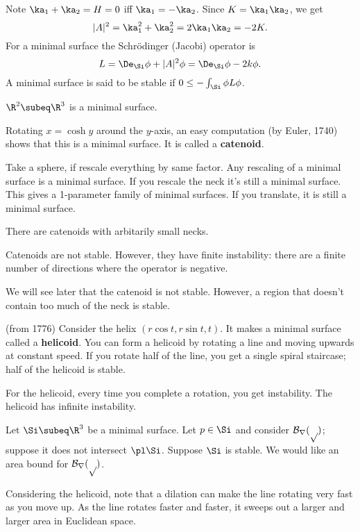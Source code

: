 Note $\ka_1+\ka_2=H=0$ iff $\ka_1=-\ka_2$. Since $K=\ka_1\ka_2$, we get
\[
|A|^2=\ka_1^2+\ka_2^2 =2\ka_1\ka_2=-2K.
\]
For a minimal surface the Schr\"odinger (Jacobi) operator is
\[
L=\De_{\Si} \phi+|A|^2\phi = \De_{\Si}\phi -2k\phi.
\]
A minimal surface is said to be stable if $0\le -\int_{\Si}\phi L\phi$.
\begin{ex}
$\R^2\subeq \R^3$ is a minimal surface.
\end{ex}
\begin{ex}
Rotating $x=\cosh y$ around the $y$-axis, an easy computation (by Euler, 1740) shows that this is a minimal surface. It is called a \textbf{catenoid}. 


Take a sphere, if rescale everything by same factor. Any rescaling of a minimal surface is a minimal surface. 
If you rescale the neck it's still a minimal surface. This gives a 1-parameter family of minimal surfaces. If you translate, it is still a minimal surface.

There are catenoids with arbitarily small necks.

Catenoids are not stable. However, they have finite instability: there are a finite number of directions where the operator is negative.
\end{ex}
We will see later that the catenoid is not stable. However, a region that doesn't contain too much of the neck is stable.
\begin{ex}(from 1776) 
Consider the helix $(r\cos t,r\sin t,t)$. It makes a minimal surface called a \textbf{helicoid}. You can form a helicoid by rotating a line and moving upwards at constant speed. If you rotate half of the line, you get a single spiral staircase; half of the helicoid is stable. 


For the helicoid, every time you complete a rotation, you get instability. %
The helicoid has infinite instability.
\end{ex}

Let $\Si\subeq \R^3$ be a minimal surface. Let $p\in \Si$ and consider $\cal B_r(p)$; suppose it does not intersect $\pl \Si$. Suppose $\Si$ is stable. We would like an area bound for $\cal B_r(p)$.

Considering the helicoid, note that a dilation can make the line rotating very fast as you move up. As the line rotates faster and faster, it sweeps out a larger and larger area in Euclidean space. 

